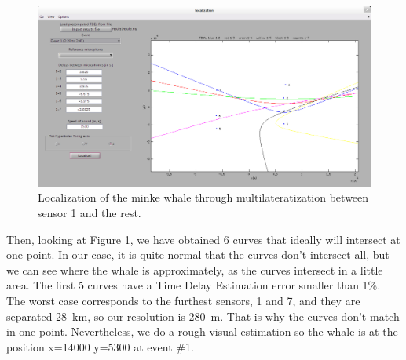 \begin{figure}[htb]
	\begin{center}
		\includegraphics[width=1\textwidth]{figures/7_local.png}
	\end{center}
	\caption{Localization of the minke whale through multilateratization between sensor 1 and the rest.}
	\label{fig:local}
\end{figure}

Then, looking at Figure \ref{fig:local}, we have obtained 6 curves that ideally will intersect at one point. In our case, it is quite normal that the curves don't intersect all, but we can see where the whale is approximately, as the curves intersect in a little area. The first 5 curves have a Time Delay Estimation error smaller than 1\%. The worst case corresponds to the furthest sensors, 1 and 7, and they are separated \SI{28}{\kilo\meter}, so our resolution is \SI{280}{\meter}. That is why the curves don't match in one point. Nevertheless, we do a rough visual estimation so the whale is at the position x=14000 y=5300 at event \#1.
